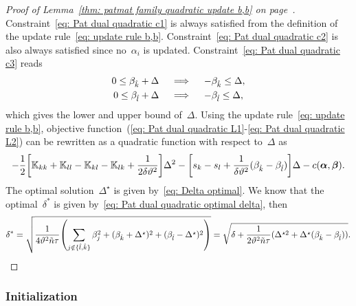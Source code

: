 \begin{proof}[Proof of Lemma~\ref{thm: patmat family quadratic update b,b} on page~\pageref{thm: patmat family quadratic update b,b}]
  Constraint~\eqref{eq: Pat dual quadratic c1} is always satisfied from the definition of the update rule~\eqref{eq: update rule b,b}. Constraint~\eqref{eq: Pat dual quadratic c2} is also always satisfied since no~$\alpha_i$ is updated. Constraint~\eqref{eq: Pat dual quadratic c3} reads
  \begin{align*}
    0 \leq \beta_{\hat{k}} + \Delta
    & \quad \implies \quad
    - \beta_{\hat{k}} \leq \Delta, \\
    0 \leq \beta_{\hat{l}} + \Delta
    & \quad \implies \quad
    - \beta_{\hat{l}} \leq \Delta, \\
  \end{align*}
  which gives the lower and upper bound of~$\Delta.$ Using the update rule~\eqref{eq: update rule b,b}, objective function~(\ref{eq: Pat dual quadratic L1}-\ref{eq: Pat dual quadratic L2}) can be rewritten as a quadratic function with respect to~$\Delta$ as
  \begin{equation*}
    - \frac{1}{2} \Brac[s]{\K_{kk} + \K_{ll} - \K_{kl} - \K_{lk} + \frac{1}{2\delta\vartheta^2}} \Delta^2
    - \Brac[s]{s_k - s_l + \frac{1}{\delta\vartheta^2}(\betak - \betal)} \Delta
    - c(\bm{\alpha}, \bm{\beta}).
  \end{equation*}
  The optimal solution~$\Delta^{\star}$ is given by~\eqref{eq: Delta optimal}.   We know that the optimal~$\delta^*$ is given by~\eqref{eq: Pat dual quadratic optimal delta}, then
  \begin{equation*}
    \delta^*
      = \sqrt{\frac{1}{4\vartheta^2 \ntil \tau} \Brac{\sum_{j \notin \{\hat{l}, \hat{k}\}} \beta_j^2 + (\betak + \Delta^\star)^2 + (\betal - \Delta^\star)^2}} 
      = \sqrt{\delta + \frac{1}{2\vartheta^2 \ntil \tau} (\Delta^{\star2} + \Delta^\star (\betak - \betal))}.
  \end{equation*}
\end{proof}

\subsubsection{Initialization}

